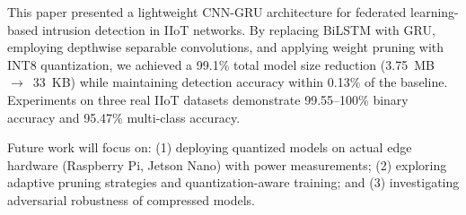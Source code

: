 \documentclass[10pt,journal]{IEEEtran}
\begin{document}
This paper presented a lightweight CNN-GRU architecture for federated learning-based intrusion detection in IIoT networks. By replacing BiLSTM with GRU, employing depthwise separable convolutions, and applying weight pruning with INT8 quantization, we achieved a 99.1\% total model size reduction (3.75~MB~$\rightarrow$~33~KB) while maintaining detection accuracy within 0.13\% of the baseline. Experiments on three real IIoT datasets demonstrate 99.55--100\% binary accuracy and 95.47\% multi-class accuracy.

Future work will focus on: (1) deploying quantized models on actual edge hardware (Raspberry Pi, Jetson Nano) with power measurements; (2) exploring adaptive pruning strategies and quantization-aware training; and (3) investigating adversarial robustness of compressed models.
\end{document}
